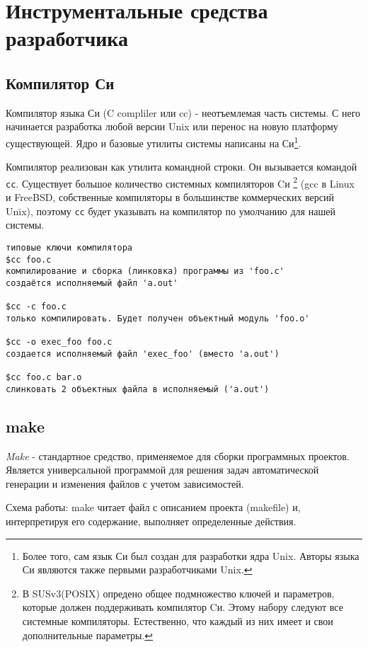 \chapter{Инструментальные средства разработчика}

\section{Компилятор Си}

Компилятор языка Си (C compliler или cc) - неотъемлемая часть системы. С него начинается разработка любой версии Unix или перенос на новую платформу существующей. Ядро и базовые утилиты системы написаны на Си\footnote{Более того, сам язык Си был создан для разработки ядра Unix. Авторы языка Си являются также первыми разработчиками Unix.}.

Компилятор реализован как утилита командной строки. Он вызывается командой \verb+cc+. Существует большое количество системных компиляторов Cи \footnote{В SUSv3(POSIX) опредено общее подмножество ключей и параметров, которые должен поддерживать компилятор Cи. Этому набору следуют все системные компиляторы. Естественно, что каждый из них имеет и свои дополнительные параметры.} (gcc в Linux и FreeBSD, собственные компиляторы в большинстве коммерческих версий Unix), поэтому \verb+cc+ будет указывать на компилятор по умолчанию для нашей системы. 

\begin{verbatim}
типовые ключи компилятора
$сс foo.c
компилирование и сборка (линковка) программы из 'foo.c' 
создаётся исполняемый файл 'a.out'

$cc -c foo.c
только компилировать. Будет получен объектный модуль 'foo.o'

$cc -o exec_foo foo.c
создается исполняемый файл 'exec_foo' (вместо 'a.out')

$cс foo.c bar.o
слинковать 2 объектных файла в исполняемый ('a.out')
\end{verbatim}


\section{make}

\emph{Make} - стандартное средство, применяемое для сборки программных проектов. Является универсальной программой для решения задач автоматической генерации и изменения файлов с учетом зависимостей.

Схема работы: make читает файл с описанием проекта (makefile) и, интерпретируя его содержание, выполняет определенные действия.

